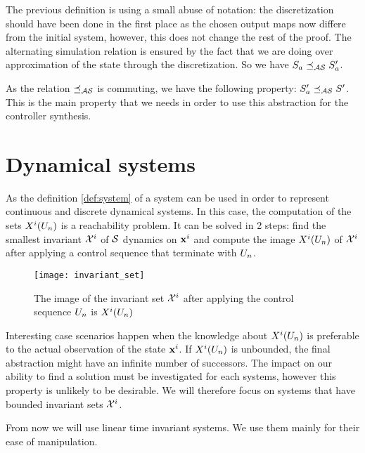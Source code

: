 The previous definition is using a small abuse of notation: the discretization should have been done in the first place as the chosen output maps now differe from the initial system, however, this does not change the rest of the proof.
The alternating simulation relation is ensured by the fact that we are doing over approximation of the state through the discretization. So we have $S_a \preceq_{\mathcal{AS}} S_a'$.

As the relation $\preceq_{\mathcal{AS}}$ is commuting, we have the following property:
$S_a' \preceq_{\mathcal{AS}} S'$. This is the main property that we needs in order to use this abstraction for the controller synthesis.



\section{Dynamical systems}
As the definition \ref{def:system} of a system can be used in order to represent continuous and discrete dynamical systems.
In this case, the computation of the sets $X^i(U_n)$ is a reachability problem.
It can be solved in 2 steps: find the smallest invariant ${\mathcal{X}^i}$ of $\mathcal{S}$ dynamics on $ \mathbf{x}^i$ and compute the image $X^i(U_n)$ of ${\mathcal{X}^i}$ after applying a control sequence that terminate with $U_n$.

\begin{figure}
\centering
\texttt{[image: invariant\_set]}
\caption{The image of the invariant set ${\mathcal{X}^i}$ after applying the control sequence $U_n$ is $X^i(U_n)$}
\end{figure}

Interesting case scenarios happen when the knowledge about $X^i(U_n)$ is preferable to the actual observation of the state $ \mathbf{x}^i$.
If $X^i(U_n)$ is unbounded, the final abstraction might have an infinite number of successors. The impact on our ability to find a solution must be investigated for each systems, however this property is unlikely to be desirable.
We will therefore focus on systems that have bounded invariant sets ${\mathcal{X}^i}$.

From now we will use linear time invariant systems. We use them mainly for their ease of manipulation.